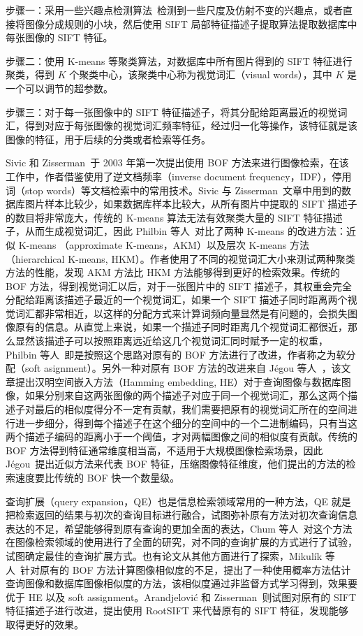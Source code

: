 步骤一：采用一些兴趣点检测算法~\cite{Mikolajczyk2004ScaleA}检测到一些尺度及仿射不变的兴趣点，或者直接将图像分成规则的小块，然后使用 SIFT 局部特征描述子提取算法提取数据库中每张图像的 SIFT 特征。

步骤二：使用 K-means 等聚类算法，对数据库中所有图片得到的 SIFT 特征进行聚类，得到 $K $ 个聚类中心，该聚类中心称为视觉词汇（visual words），其中 $K$ 是一个可以调节的超参数。

步骤三：对于每一张图像中的 SIFT 特征描述子，将其分配给距离最近的视觉词汇，得到对应于每张图像的视觉词汇频率特征，经过归一化等操作，该特征就是该图像的特征，用于后续的分类或者检索等任务。

Sivic 和 Zisserman~\cite{Sivic2003VideoGA}于 2003 年第一次提出使用 BOF 方法来进行图像检索，在该工作中，作者借鉴使用了逆文档频率（inverse document frequency，IDF），停用词（stop words）等文档检索中的常用技术。Sivic 与 Zisserman~\cite{Sivic2003VideoGA}文章中用到的数据库图片样本比较少，如果数据库样本比较大，从所有图片中提取的 SIFT 描述子的数目将非常庞大，传统的 K-means 算法无法有效聚类大量的 SIFT 特征描述子，从而生成视觉词汇，因此 Philbin 等人~\cite{Philbin2007ObjectRW}对比了两种 K-means 的改进方法：近似 K-means （approximate K-means，AKM）以及层次 K-means 方法（hierarchical K-means, HKM）。作者使用了不同的视觉词汇大小来测试两种聚类方法的性能，发现 AKM 方法比 HKM 方法能够得到更好的检索效果。传统的 BOF 方法，得到视觉词汇以后，对于一张图片中的 SIFT 描述子，其权重会完全分配给距离该描述子最近的一个视觉词汇，如果一个 SIFT 描述子同时距离两个视觉词汇都非常相近，以这样的分配方式来计算词频向量显然是有问题的，会损失图像原有的信息。从直觉上来说，如果一个描述子同时距离几个视觉词汇都很近，那么显然该描述子可以按照距离远近给这几个视觉词汇同时赋予一定的权重，Philbin 等人~\cite{Philbin2008LostIQ}即是按照这个思路对原有的 BOF 方法进行了改进，作者称之为软分配（soft asignment）。另外一种对原有 BOF 方法的改进来自 J{\'e}gou 等人~\cite{Jgou2008HammingEA}，该文章提出汉明空间嵌入方法（Hamming embedding, HE）对于查询图像与数据库图像，如果分别来自这两张图像的两个描述子对应于同一个视觉词汇，那么这两个描述子对最后的相似度得分不一定有贡献，我们需要把原有的视觉词汇所在的空间进行进一步细分，得到每个描述子在这个细分的空间中的一个二进制编码，只有当这两个描述子编码的距离小于一个阈值，才对两幅图像之间的相似度有贡献。传统的 BOF 方法得到特征通常维度相当高，不适用于大规模图像检索场景，因此 J{\'e}gou~\cite{Jgou2009PackingB}提出近似方法来代表 BOF 特征，压缩图像特征维度，他们提出的方法的检索速度要比传统的 BOF 快一个数量级。

查询扩展（query expansion，QE）也是信息检索领域常用的一种方法，QE 就是把检索返回的结果与初次的查询目标进行融合，试图弥补原有方法对初次查询信息表达的不足，希望能够得到原有查询的更加全面的表达，Chum 等人~\cite{Chum2007TotalRA}对这个方法在图像检索领域的使用进行了全面的研究，对不同的查询扩展的方式进行了试验，试图确定最佳的查询扩展方式。也有论文从其他方面进行了探索，Mikulík 等人~\cite{Mikulk2010LearningAF}针对原有的 BOF 方法计算图像相似度的不足，提出了一种使用概率方法估计查询图像和数据库图像相似度的方法，该相似度通过非监督方式学习得到，效果要优于 HE 以及 soft assignment。Arandjelovi{\'c} 和 Zisserman~\cite{Arandjelovic2012ThreeTE}则试图对原有的 SIFT 特征描述子进行改进，提出使用 RootSIFT 来代替原有的 SIFT 特征，发现能够取得更好的效果。

